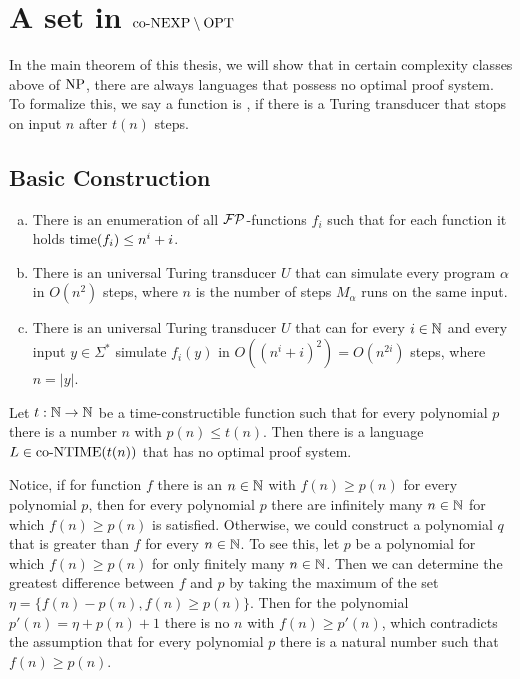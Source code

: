 \chapter{A set in $\text{co-NEXP} \setminus \text{OPT}$} \label{chpConexpMinusOpt}
  In the main theorem of this thesis, we will show that in certain complexity classes above of \(\text{NP}\), there are always languages that possess no optimal proof system. To formalize this, we say a function is , if there is a Turing transducer that stops on input \(n\) after \(t(n)\) steps.

  \section{Basic Construction}
  
  \begin{lemma}\label{lemSimulation}
    \begin{enumerate}[(a)]
     \item There is an enumeration of all \(\mathcal{FP}\)-functions \(f_i\) such that for each function it holds \(\operatorname{time}(f_i) \leq n^i + i\).
     \item There is an universal Turing transducer \(U\) that can simulate every program \(\alpha\) in \(O(n^2)\) steps, where \(n\) is the number of steps \(M_\alpha\) runs on the same input.
     \item There is an universal Turing transducer \(U\) that can for every \(i \in \mathbb{N}\) and every input \(y \in \Sigma^*\) simulate \(f_i(y)\) in \(O((n^i + i)^2) = O(n^{2i})\) steps, where \(n = |y|\).
    \end{enumerate}
  \end{lemma}
  
  
  \begin{theorem}\label{thmMain}
    Let \(t : \mathbb{N} \to \mathbb{N}\) be a time-constructible function such that for every polynomial \(p\) there is a number \(n\) with \(p(n) \leq t(n)\). Then there is a language \(L \in \text{co-NTIME}(t(n))\) that has no optimal proof system.
  \end{theorem}

  Notice, if for function \(f\) there is an \(n \in \mathbb{N}\) with \(f(n) \geq p(n)\) for every polynomial \(p\), then for every polynomial \(p\) there are infinitely many \(n \in \mathbb{N}\) for which \(f(n) \geq p(n)\) is satisfied. Otherwise, we could construct a polynomial \(q\) that is greater than \(f\) for every \(n \in \mathbb{N}\). To see this, let \(p\) be a polynomial for which \(f(n) \geq p(n)\) for only finitely many \(n \in \mathbb{N}\). Then we can determine the greatest difference between \(f\) and \(p\) by taking the maximum of the set \(\eta = \{ f(n) - p(n), f(n) \geq p(n) \}\). Then for the polynomial \(p'(n) = \eta + p(n) + 1\) there is no \(n\) with \(f(n) \geq p'(n)\), which contradicts the assumption that for every polynomial \(p\) there is a natural number such that \(f(n) \geq p(n)\).

